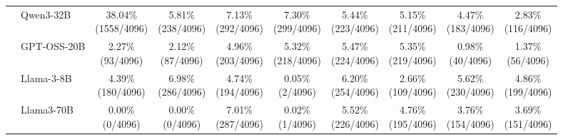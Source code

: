 \begin{table}[t]
{\begin{tabular}{ll*{8}{c}}
 & Qwen3-32B & \makecell[c]{38.04\%\\[-1pt]\scriptsize(1558/4096)} & \makecell[c]{5.81\%\\[-1pt]\scriptsize(238/4096)} & \makecell[c]{7.13\%\\[-1pt]\scriptsize(292/4096)} & \makecell[c]{7.30\%\\[-1pt]\scriptsize(299/4096)} & \makecell[c]{5.44\%\\[-1pt]\scriptsize(223/4096)} & \makecell[c]{5.15\%\\[-1pt]\scriptsize(211/4096)} & \makecell[c]{4.47\%\\[-1pt]\scriptsize(183/4096)} & \makecell[c]{2.83\%\\[-1pt]\scriptsize(116/4096)} \\
 & GPT-OSS-20B & \makecell[c]{2.27\%\\[-1pt]\scriptsize(93/4096)} & \makecell[c]{2.12\%\\[-1pt]\scriptsize(87/4096)} & \makecell[c]{4.96\%\\[-1pt]\scriptsize(203/4096)} & \makecell[c]{5.32\%\\[-1pt]\scriptsize(218/4096)} & \makecell[c]{5.47\%\\[-1pt]\scriptsize(224/4096)} & \makecell[c]{5.35\%\\[-1pt]\scriptsize(219/4096)} & \makecell[c]{0.98\%\\[-1pt]\scriptsize(40/4096)} & \makecell[c]{1.37\%\\[-1pt]\scriptsize(56/4096)} \\
 & Llama-3-8B & \makecell[c]{4.39\%\\[-1pt]\scriptsize(180/4096)} & \makecell[c]{6.98\%\\[-1pt]\scriptsize(286/4096)} & \makecell[c]{4.74\%\\[-1pt]\scriptsize(194/4096)} & \makecell[c]{0.05\%\\[-1pt]\scriptsize(2/4096)} & \makecell[c]{6.20\%\\[-1pt]\scriptsize(254/4096)} & \makecell[c]{2.66\%\\[-1pt]\scriptsize(109/4096)} & \makecell[c]{5.62\%\\[-1pt]\scriptsize(230/4096)} & \makecell[c]{4.86\%\\[-1pt]\scriptsize(199/4096)} \\
 & Llama3-70B & \makecell[c]{0.00\%\\[-1pt]\scriptsize(0/4096)} & \makecell[c]{0.00\%\\[-1pt]\scriptsize(0/4096)} & \makecell[c]{7.01\%\\[-1pt]\scriptsize(287/4096)} & \makecell[c]{0.02\%\\[-1pt]\scriptsize(1/4096)} & \makecell[c]{5.52\%\\[-1pt]\scriptsize(226/4096)} & \makecell[c]{4.76\%\\[-1pt]\scriptsize(195/4096)} & \makecell[c]{3.76\%\\[-1pt]\scriptsize(154/4096)} & \makecell[c]{3.69\%\\[-1pt]\scriptsize(151/4096)} \\

\end{tabular}}
\end{table}
